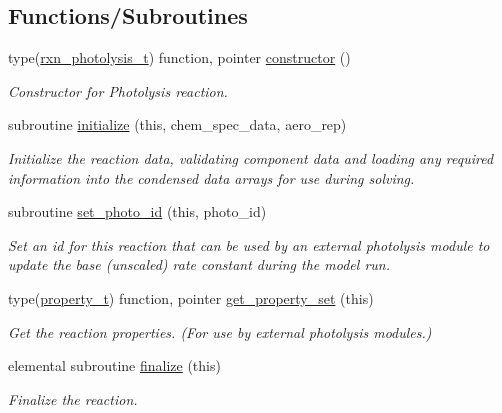 \subsection*{Functions/\+Subroutines}
\begin{DoxyCompactItemize}
\item 
type(\mbox{\hyperlink{structpmc__rxn__photolysis_1_1rxn__photolysis__t}{rxn\+\_\+photolysis\+\_\+t}}) function, pointer \mbox{\hyperlink{namespacepmc__rxn__photolysis_a707869a2e17f3c990a319ea4f499f817}{constructor}} ()
\begin{DoxyCompactList}\small\item\em Constructor for Photolysis reaction. \end{DoxyCompactList}\item 
subroutine \mbox{\hyperlink{namespacepmc__rxn__photolysis_a5bb1a44b92cddb65c916ce21407f100f}{initialize}} (this, chem\+\_\+spec\+\_\+data, aero\+\_\+rep)
\begin{DoxyCompactList}\small\item\em Initialize the reaction data, validating component data and loading any required information into the condensed data arrays for use during solving. \end{DoxyCompactList}\item 
subroutine \mbox{\hyperlink{namespacepmc__rxn__photolysis_a1f8dd20a2cecce0ac7743554aa07391e}{set\+\_\+photo\+\_\+id}} (this, photo\+\_\+id)
\begin{DoxyCompactList}\small\item\em Set an id for this reaction that can be used by an external photolysis module to update the base (unscaled) rate constant during the model run. \end{DoxyCompactList}\item 
type(\mbox{\hyperlink{structpmc__property_1_1property__t}{property\+\_\+t}}) function, pointer \mbox{\hyperlink{namespacepmc__rxn__photolysis_a924562930599077fc2c7ec9d2c470e84}{get\+\_\+property\+\_\+set}} (this)
\begin{DoxyCompactList}\small\item\em Get the reaction properties. (For use by external photolysis modules.) \end{DoxyCompactList}\item 
elemental subroutine \mbox{\hyperlink{namespacepmc__rxn__photolysis_a187bdf76b3c0f39f73d8cbab0a813ac9}{finalize}} (this)
\begin{DoxyCompactList}\small\item\em Finalize the reaction. \end{DoxyCompactList}\item 

\end{DoxyCompactItemize}
